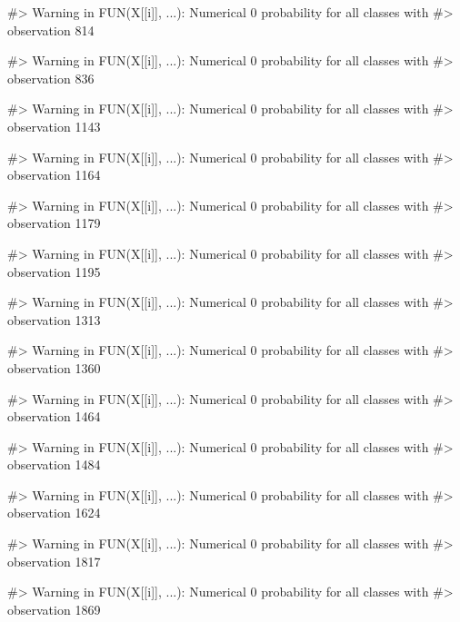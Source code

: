 \begin{Schunk}
\begin{Soutput}
#> Warning in FUN(X[[i]], ...): Numerical 0 probability for all classes with
#> observation 814
\end{Soutput}
\begin{Soutput}
#> Warning in FUN(X[[i]], ...): Numerical 0 probability for all classes with
#> observation 836
\end{Soutput}
\begin{Soutput}
#> Warning in FUN(X[[i]], ...): Numerical 0 probability for all classes with
#> observation 1143
\end{Soutput}
\begin{Soutput}
#> Warning in FUN(X[[i]], ...): Numerical 0 probability for all classes with
#> observation 1164
\end{Soutput}
\begin{Soutput}
#> Warning in FUN(X[[i]], ...): Numerical 0 probability for all classes with
#> observation 1179
\end{Soutput}
\begin{Soutput}
#> Warning in FUN(X[[i]], ...): Numerical 0 probability for all classes with
#> observation 1195
\end{Soutput}
\begin{Soutput}
#> Warning in FUN(X[[i]], ...): Numerical 0 probability for all classes with
#> observation 1313
\end{Soutput}
\begin{Soutput}
#> Warning in FUN(X[[i]], ...): Numerical 0 probability for all classes with
#> observation 1360
\end{Soutput}
\begin{Soutput}
#> Warning in FUN(X[[i]], ...): Numerical 0 probability for all classes with
#> observation 1464
\end{Soutput}
\begin{Soutput}
#> Warning in FUN(X[[i]], ...): Numerical 0 probability for all classes with
#> observation 1484
\end{Soutput}
\begin{Soutput}
#> Warning in FUN(X[[i]], ...): Numerical 0 probability for all classes with
#> observation 1624
\end{Soutput}
\begin{Soutput}
#> Warning in FUN(X[[i]], ...): Numerical 0 probability for all classes with
#> observation 1817
\end{Soutput}
\begin{Soutput}
#> Warning in FUN(X[[i]], ...): Numerical 0 probability for all classes with
#> observation 1869
\end{Soutput}

\end{Schunk}
